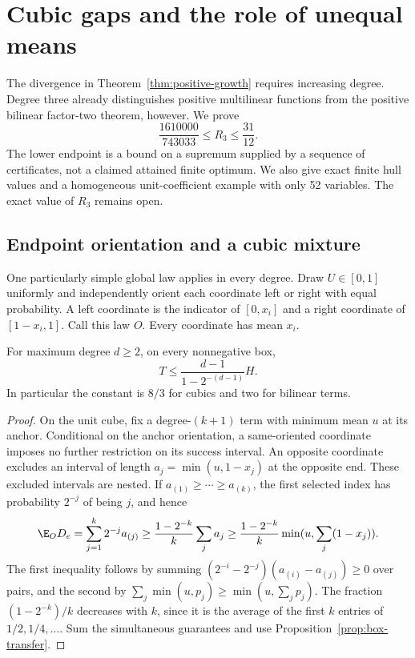 \section{Cubic gaps and the role of unequal means}\label{sec:cubic}
The divergence in Theorem~\ref{thm:positive-growth} requires increasing
degree. Degree three already distinguishes positive multilinear functions
from the positive bilinear factor-two theorem, however. We prove
\begin{equation}\label{eq:cubic-interval}
 \frac{1610000}{743033}\le R_3\le\frac{31}{12}.
\end{equation}
The lower endpoint is a bound on a supremum supplied by a sequence of
certificates, not a claimed attained finite optimum. We also give exact
finite hull values and a homogeneous unit-coefficient example with only
52 variables. The exact value of $R_3$ remains open.

\subsection{Endpoint orientation and a cubic mixture}
One particularly simple global law applies in every degree. Draw
$U\in[0,1]$ uniformly and independently orient each coordinate left or
right with equal probability. A left coordinate is the indicator of
$[0,x_i]$ and a right coordinate of $[1-x_i,1]$. Call this law $O$.
Every coordinate has mean $x_i$.

\begin{proposition}\label{prop:endpoint-orientation}
For maximum degree $d\ge2$, on every nonnegative box,
\begin{equation}\label{eq:endpoint-bound}
 T\le\frac{d-1}{1-2^{-(d-1)}}H.
\end{equation}
In particular the constant is $8/3$ for cubics and two for bilinear terms.
\end{proposition}
\begin{proof}
On the unit cube, fix a degree-$(k+1)$ term with minimum mean $u$ at its
anchor. Conditional on the anchor orientation, a same-oriented coordinate
imposes no further restriction on its success interval. An opposite
coordinate excludes an interval of length $a_j=\min(u,1-x_j)$ at the
opposite end. These excluded intervals are nested. If
$a_{(1)}\ge\cdots\ge a_{(k)}$, the first selected index has probability
$2^{-j}$ of being $j$, and hence
\[
 \E_O D_e=\sum_{j=1}^k2^{-j}a_{(j)}
 \ge\frac{1-2^{-k}}{k}\sum_ja_j
 \ge\frac{1-2^{-k}}{k}\min(u,\sum_j(1-x_j)).
\]
The first inequality follows by summing
$(2^{-i}-2^{-j})(a_{(i)}-a_{(j)})\ge0$ over pairs, and the second by
$\sum_j\min(u,p_j)\ge\min(u,\sum_jp_j)$. The fraction
$(1-2^{-k})/k$ decreases with $k$, since it is the average of the first
$k$ entries of $1/2,1/4,\ldots$. Sum the simultaneous guarantees and use
Proposition~\ref{prop:box-transfer}.
\end{proof}

